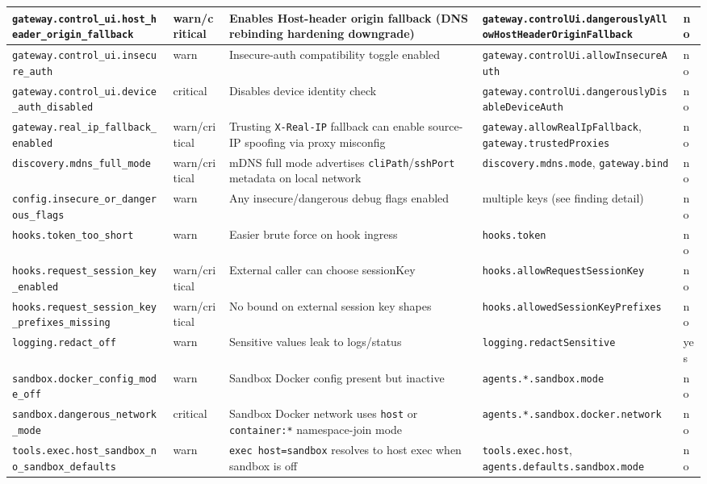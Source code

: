 \begin{table}[h]
\begin{tabular}{|l|l|l|l|l|}
\hline
\texttt{gateway.control\_ui.host\_header\_origin\_fallback} & warn/critical & Enables Host-header origin fallback (DNS rebinding hardening downgrade) & \texttt{gateway.controlUi.dangerouslyAllowHostHeaderOriginFallback} & no \\
\hline
\texttt{gateway.control\_ui.insecure\_auth} & warn & Insecure-auth compatibility toggle enabled & \texttt{gateway.controlUi.allowInsecureAuth} & no \\
\hline
\texttt{gateway.control\_ui.device\_auth\_disabled} & critical & Disables device identity check & \texttt{gateway.controlUi.dangerouslyDisableDeviceAuth} & no \\
\hline
\texttt{gateway.real\_ip\_fallback\_enabled} & warn/critical & Trusting \texttt{X-Real-IP} fallback can enable source-IP spoofing via proxy misconfig & \texttt{gateway.allowRealIpFallback}, \texttt{gateway.trustedProxies} & no \\
\hline
\texttt{discovery.mdns\_full\_mode} & warn/critical & mDNS full mode advertises \texttt{cliPath}/\texttt{sshPort} metadata on local network & \texttt{discovery.mdns.mode}, \texttt{gateway.bind} & no \\
\hline
\texttt{config.insecure\_or\_dangerous\_flags} & warn & Any insecure/dangerous debug flags enabled & multiple keys (see finding detail) & no \\
\hline
\texttt{hooks.token\_too\_short} & warn & Easier brute force on hook ingress & \texttt{hooks.token} & no \\
\hline
\texttt{hooks.request\_session\_key\_enabled} & warn/critical & External caller can choose sessionKey & \texttt{hooks.allowRequestSessionKey} & no \\
\hline
\texttt{hooks.request\_session\_key\_prefixes\_missing} & warn/critical & No bound on external session key shapes & \texttt{hooks.allowedSessionKeyPrefixes} & no \\
\hline
\texttt{logging.redact\_off} & warn & Sensitive values leak to logs/status & \texttt{logging.redactSensitive} & yes \\
\hline
\texttt{sandbox.docker\_config\_mode\_off} & warn & Sandbox Docker config present but inactive & \texttt{agents.*.sandbox.mode} & no \\
\hline
\texttt{sandbox.dangerous\_network\_mode} & critical & Sandbox Docker network uses \texttt{host} or \texttt{container:*} namespace-join mode & \texttt{agents.*.sandbox.docker.network} & no \\
\hline
\texttt{tools.exec.host\_sandbox\_no\_sandbox\_defaults} & warn & \texttt{exec host=sandbox} resolves to host exec when sandbox is off & \texttt{tools.exec.host}, \texttt{agents.defaults.sandbox.mode} & no \\

\end{tabular}
\end{table}
